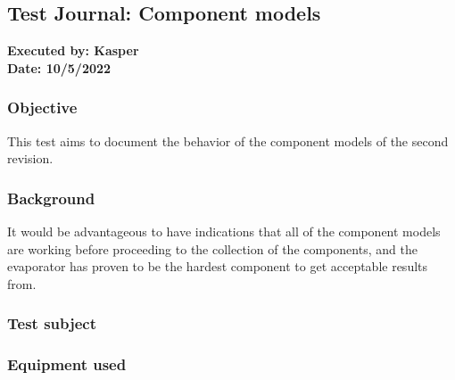 \subsection{Test Journal: Component models} \label{app:tj_0}

\textbf{Executed by: Kasper} \\
\textbf{Date: 10/5/2022}

\subsubsection*{Objective}
This test aims to document the behavior of the component models of the second revision.

\subsubsection*{Background}

It would be advantageous to have indications that all of the component models are working before proceeding to the collection of the components, and the evaporator has proven to be the hardest component to get acceptable results from.

\subsubsection*{Test subject}

\subsubsection*{Equipment used}

